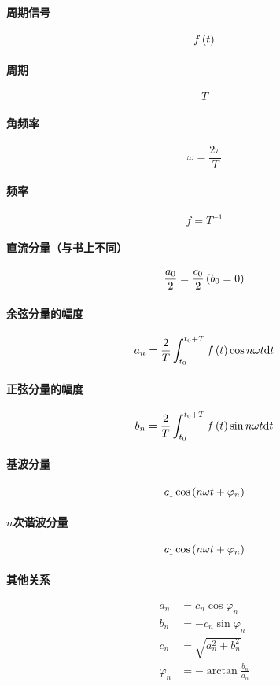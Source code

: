 \documentclass{article}
\begin{document}
\paragraph{周期信号}\[f\left(t\right)\]

\paragraph{周期}\[T\]

\paragraph{角频率}\[\omega=\frac{2\pi}T\]

\paragraph{频率}\[f=T^{-1}\]

\paragraph{直流分量（与书上不同）}\[\frac{a_0}2=\frac{c_0}2\left(b_0=0\right)\]

\paragraph{余弦分量的幅度}

\[a_n=\frac2T\int_{t_0}^{t_0+T}f\left(t\right)\cos n\omega t\mathrm d t\]

\paragraph{正弦分量的幅度}

\[b_n=\frac2T\int_{t_0}^{t_0+T}f\left(t\right)\sin n\omega t\mathrm d t\]

\paragraph{基波分量}\[c_1\cos\left(n\omega t+\varphi_n\right)\]

\paragraph{$n$次谐波分量}\[c_1\cos\left(n\omega t+\varphi_n\right)\]

\paragraph{其他关系}

\[\begin{aligned}
        a_n       & =c_n\cos\varphi_n        \\
        b_n       & =-c_n\sin\varphi_n       \\
        c_n       & =\sqrt{a_n^2+b_n^2}      \\
        \varphi_n & =-\arctan\frac{b_n}{a_n}
    \end{aligned}\]
\end{document}
